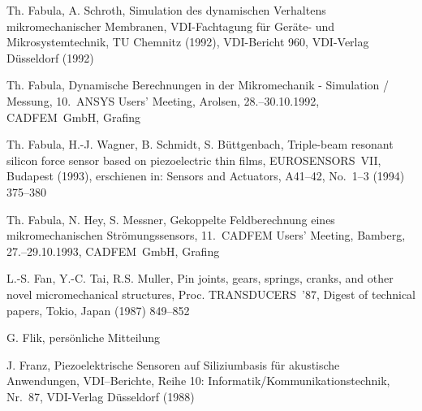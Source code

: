 \begin{thebibliography}{xxx}
 Th. Fabula, A. Schroth, Simulation des dynamischen Verhaltens
 mikromechanischer Membranen, VDI-Fachtagung für Geräte- und
 Mikrosystemtechnik, TU Chemnitz (1992), VDI-Bericht 960, VDI-Verlag
 Düsseldorf (1992)

 Th. Fabula, Dynamische Berechnungen in der Mikromechanik - Simulation /
 Messung, 10.~{\sf ANSYS} Users' Meeting, Arolsen, 28.--30.10.1992,
 CADFEM~GmbH, Grafing

 Th. Fabula, H.-J. Wagner, B. Schmidt, S. Büttgenbach, Triple-beam resonant
 silicon force sensor based on piezoelectric thin films, EUROSENSORS~VII,
 Budapest (1993), erschienen in: Sensors and Actuators, A41--42,
 No.~1--3 (1994) 375--380

 Th. Fabula, N. Hey, S. Messner, Gekoppelte Feldberechnung eines
 mikromechanischen Strömungssensors, 11.~CADFEM Users' Meeting, Bamberg,
 27.--29.10.1993, CADFEM~GmbH, Grafing


 L.-S. Fan, Y.-C. Tai, R.S. Muller, Pin joints, gears, springs, cranks, and
 other novel micromechanical structures, Proc. TRANSDUCERS~'87, Digest of
 technical papers, Tokio, Japan (1987) 849--852




 G. Flik, persönliche Mitteilung

 J. Franz, Piezoelektrische Sensoren auf Siliziumbasis für akustische
 Anwendungen, VDI--Berichte, Reihe 10: Informatik/Kommunikationstechnik,
 Nr.~87, VDI-Verlag Düsseldorf (1988)


\end{thebibliography}
